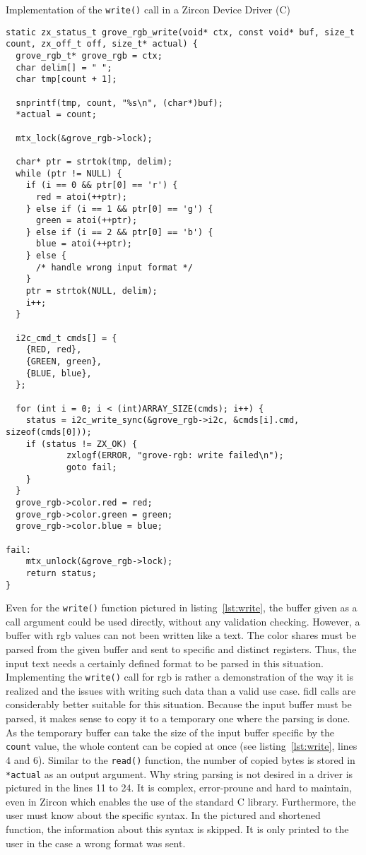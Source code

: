 \begin{listing} [H]
    \caption{Implementation of the \texttt{write()} call in a Zircon Device Driver (C)}
\label{lst:write}
\begin{verbatim}
static zx_status_t grove_rgb_write(void* ctx, const void* buf, size_t count, zx_off_t off, size_t* actual) {
  grove_rgb_t* grove_rgb = ctx;
  char delim[] = " ";
  char tmp[count + 1];
    
  snprintf(tmp, count, "%s\n", (char*)buf);
  *actual = count;

  mtx_lock(&grove_rgb->lock);

  char* ptr = strtok(tmp, delim);
  while (ptr != NULL) {
    if (i == 0 && ptr[0] == 'r') {
      red = atoi(++ptr);
    } else if (i == 1 && ptr[0] == 'g') {
      green = atoi(++ptr);
    } else if (i == 2 && ptr[0] == 'b') {
      blue = atoi(++ptr);
    } else {
      /* handle wrong input format */
    }
    ptr = strtok(NULL, delim);
    i++;
  }

  i2c_cmd_t cmds[] = {
    {RED, red},
    {GREEN, green},
    {BLUE, blue},
  };

  for (int i = 0; i < (int)ARRAY_SIZE(cmds); i++) {
    status = i2c_write_sync(&grove_rgb->i2c, &cmds[i].cmd, sizeof(cmds[0]));
    if (status != ZX_OK) {
            zxlogf(ERROR, "grove-rgb: write failed\n");
            goto fail;
    }
  }
  grove_rgb->color.red = red;
  grove_rgb->color.green = green;
  grove_rgb->color.blue = blue;

fail:
    mtx_unlock(&grove_rgb->lock);
    return status;
}
\end{verbatim}
\end{listing}

Even for the \texttt{write()} function pictured in listing~\ref{lst:write}, the buffer given as a call argument could be used directly, without any validation checking.
However, a buffer with \ac{rgb} values can not been written like a text.
The color shares must be parsed from the given buffer and sent to specific and distinct registers.
Thus, the input text needs a certainly defined format to be parsed in this situation.
Implementing the \texttt{write()} call for \ac{rgb} is rather a demonstration of the way it is realized and the issues with writing such data than a valid use case.
\ac{fidl} calls are considerably better suitable for this situation.
Because the input buffer must be parsed, it makes sense to copy it to a temporary one where the parsing is done.
As the temporary buffer can take the size of the input buffer specific by the \texttt{count} value, the whole content can be copied at once (see listing~\ref{lst:write}, lines 4 and 6).
Similar to the \texttt{read()} function, the number of copied bytes is stored in \texttt{*actual} as an output argument.
Why string parsing is not desired in a driver is pictured in the lines 11 to 24.
It is complex, error-proune and hard to maintain, even in Zircon which enables the use of the standard C library.
Furthermore, the user must know about the specific syntax.
In the pictured and shortened function, the information about this syntax is skipped.
It is only printed to the user in the case a wrong format was sent.

